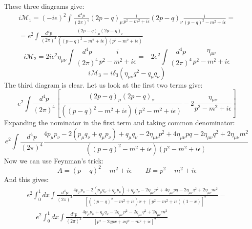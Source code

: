 \documentclass{article}
\begin{document}
\newline
These three diagrams give:
\begin{equation}
\begin{gathered}
    i\mathcal{M}_1 = (-ie)^2\int \frac{d^4 p}{(2\pi)^4} (2p - q)_\mu \frac{i}{p^2 - m^2 + i\epsilon} (2p - q)_\nu \frac{i}{(p - q)^2 - m^2 + i\epsilon} = \\ =
    e^2 \int \frac{d^4 p}{(2\pi)^4} \frac{(2p - q)_\mu(2p - q)_\nu}{\left((p - q)^2 - m^2 + i\epsilon\right)\left(p^2 - m^2 + i\epsilon\right)}
\end{gathered}
\end{equation}
\begin{equation}
    i\mathcal{M}_2 = 2ie^2 \eta_{\mu\nu} \int \frac{d^4 p}{(2\pi)^4} \frac{i}{p^2 - m^2 + i\epsilon} = -2e^2 \int \frac{d^4 p}{(2\pi)^4} \frac{\eta_{\mu\nu}}{p^2 - m^2 + i\epsilon}
\end{equation}
\begin{equation}
    i\mathcal{M}_3 = i\delta_3 \left(\eta_{\mu\nu} q^2 - q_\mu q_\nu\right)
\end{equation}
The third diagram is clear. Let us look at the first two terms give:
\begin{equation}
    e^2 \int \frac{d^4 p}{(2\pi)^4} \left[
        \frac{(2p - q)_\mu(2p - q)_\nu}{\left((p - q)^2 - m^2 + i\epsilon\right)\left(p^2 - m^2 + i\epsilon\right)} - 2 \frac{\eta_{\mu\nu}}{p^2 - m^2 + i\epsilon}
    \right]
\end{equation}
Expanding the nominator in the first term and taking common denominator:
\begin{equation}
    e^2 \int \frac{d^4 p}{(2\pi)^4}
        \frac{4 p_\mu p_\nu - 2(p_\mu q_\nu + q_\mu p_\nu) + q_\mu q_\nu - 2\eta_{\mu\nu} p^2 + 4 \eta_{\mu\nu} pq - 2\eta_{\mu\nu} q^2 + 2\eta_{\mu\nu} m^2}{\left((p - q)^2 - m^2 + i\epsilon\right)\left(p^2 - m^2 + i\epsilon\right)}
\end{equation}
Now we can use Feynman's trick:
\begin{equation}
    A = (p - q)^2 - m^2 + i\epsilon
    \qquad
    B = p^2 - m^2 + i\epsilon
\end{equation}
And this gives:
\begin{equation}
\begin{gathered}
    e^2 \int_0^1 dx \int \frac{d^4 p}{(2\pi)^4}
    \frac{4 p_\mu p_\nu - 2(p_\mu q_\nu + q_\mu p_\nu) + q_\mu q_\nu - 2\eta_{\mu\nu} p^2 + 4 \eta_{\mu\nu} pq - 2\eta_{\mu\nu} q^2 + 2\eta_{\mu\nu} m^2}{\left[
        \left((p - q)^2 - m^2 + i\epsilon\right)x + \left(p^2 - m^2 + i\epsilon\right)(1 - x)
    \right]^2} = \\ =
    e^2 \int_0^1 dx \int \frac{d^4 p}{(2\pi)^4}
    \frac{4 p_\mu p_\nu + q_\mu q_\nu - 2\eta_{\mu\nu} p^2 - 2\eta_{\mu\nu} q^2 + 2\eta_{\mu\nu} m^2}{\left[p^2 - 2qpx + xq^2 - m^2 + i\epsilon\right]^2}
\end{gathered}
\end{equation}
\end{document}
